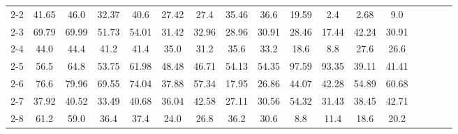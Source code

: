 \begin{table*}
{\begin{tabular}{l|cccc|cccc|cccccccc}
2-2 & \cellcolor{Green!0.0}41.65 & \cellcolor{Green!0.0}46.0 & \cellcolor{Green!3.0}32.37 & \cellcolor{Green!2.2}40.6 & \cellcolor{Green!28.4}27.42 & \cellcolor{Green!38.4}27.4 & \cellcolor{Green!6.8}35.46 & \cellcolor{Green!10.0}36.6 & \cellcolor{Green!23.4}19.59 & \cellcolor{Green!21.6}2.4 & \cellcolor{Green!11.6}2.68 & \cellcolor{Green!17.0}9.0 \\
2-3 & \cellcolor{Green!0.0}69.79 & \cellcolor{Green!0.0}69.99 & \cellcolor{Green!1.0}51.73 & \cellcolor{Green!0.4}54.01 & \cellcolor{Green!19.4}31.42 & \cellcolor{Green!21.8}32.96 & \cellcolor{Green!14.2}28.96 & \cellcolor{Green!16.6}30.91 & \cellcolor{Green!27.2}28.46 & \cellcolor{Green!42.4}17.44 & \cellcolor{Green!27.0}42.24 & \cellcolor{Green!47.6}30.91 \\
2-4 & \cellcolor{Green!1.6}44.0 & \cellcolor{Green!3.0}44.4 & \cellcolor{Green!3.4}41.2 & \cellcolor{Green!2.8}41.4 & \cellcolor{Green!13.0}35.0 & \cellcolor{Green!4.0}31.2 & \cellcolor{Green!7.8}35.6 & \cellcolor{Green!6.0}33.2 & \cellcolor{Green!29.4}18.6 & \cellcolor{Green!38.6}8.8 & \cellcolor{Green!15.8}27.6 & \cellcolor{Green!12.6}26.6 \\
2-5 & \cellcolor{Green!0.0}56.5 & \cellcolor{Green!0.0}64.8 & \cellcolor{Green!0.0}53.75 & \cellcolor{Green!0.0}61.98 & \cellcolor{Green!0.0}48.48 & \cellcolor{Green!0.0}46.71 & \cellcolor{Green!0.0}54.13 & \cellcolor{Green!0.0}54.35 & \cellcolor{Green!0.0}97.59 & \cellcolor{Green!0.0}93.35 & \cellcolor{Green!0.0}39.11 & \cellcolor{Green!0.0}41.41 \\
2-6 & \cellcolor{Green!0.0}76.6 & \cellcolor{Green!0.0}79.96 & \cellcolor{Green!0.0}69.55 & \cellcolor{Green!0.0}74.04 & \cellcolor{Green!0.0}37.88 & \cellcolor{Green!0.0}57.34 & \cellcolor{Green!0.0}17.95 & \cellcolor{Green!0.0}26.86 & \cellcolor{Green!0.0}44.07 & \cellcolor{Green!0.0}42.28 & \cellcolor{Green!0.0}54.89 & \cellcolor{Green!0.0}60.68 \\
2-7 & \cellcolor{Green!0.0}37.92 & \cellcolor{Green!0.0}40.52 & \cellcolor{Green!0.0}33.49 & \cellcolor{Green!0.0}40.68 & \cellcolor{Green!0.0}36.04 & \cellcolor{Green!0.0}42.58 & \cellcolor{Green!0.0}27.11 & \cellcolor{Green!0.0}30.56 & \cellcolor{Green!0.0}54.32 & \cellcolor{Green!0.0}31.43 & \cellcolor{Green!0.0}38.45 & \cellcolor{Green!0.0}42.71 \\
2-8 & \cellcolor{Green!0.0}61.2 & \cellcolor{Green!0.0}59.0 & \cellcolor{Green!0.0}36.4 & \cellcolor{Green!0.0}37.4 & \cellcolor{Green!0.0}24.0 & \cellcolor{Green!0.0}26.8 & \cellcolor{Green!0.0}36.2 & \cellcolor{Green!0.0}30.6 & \cellcolor{Green!20.6}8.8 & \cellcolor{Green!1.4}11.4 & \cellcolor{Green!1.0}18.6 & \cellcolor{Green!1.8}20.2 \\

\end{tabular}}
\end{table*}
